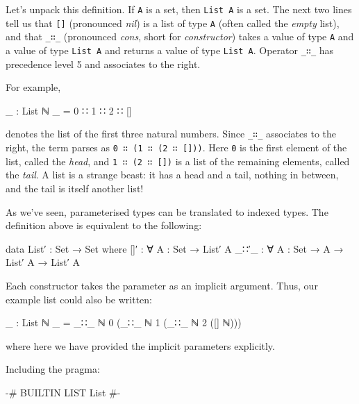 Let's unpack this definition. If \texttt{A} is a set, then
\texttt{List\ A} is a set. The next two lines tell us that
\texttt{{[}{]}} (pronounced \emph{nil}) is a list of type \texttt{A}
(often called the \emph{empty} list), and that \texttt{\_∷\_}
(pronounced \emph{cons}, short for \emph{constructor}) takes a value of
type \texttt{A} and a value of type \texttt{List\ A} and returns a value
of type \texttt{List\ A}. Operator \texttt{\_∷\_} has precedence level 5
and associates to the right.

For example,

\begin{fence}
\begin{code}
_ : List ℕ
_ = 0 ∷ 1 ∷ 2 ∷ []
\end{code}
\end{fence}

denotes the list of the first three natural numbers. Since
\texttt{\_∷\_} associates to the right, the term parses as
\texttt{0\ ∷\ (1\ ∷\ (2\ ∷\ {[}{]}))}. Here \texttt{0} is the first
element of the list, called the \emph{head}, and
\texttt{1\ ∷\ (2\ ∷\ {[}{]})} is a list of the remaining elements,
called the \emph{tail}. A list is a strange beast: it has a head and a
tail, nothing in between, and the tail is itself another list!

As we've seen, parameterised types can be translated to indexed types.
The definition above is equivalent to the following:

\begin{fence}
\begin{code}
data List′ : Set → Set where
  []′  : ∀ {A : Set} → List′ A
  _∷′_ : ∀ {A : Set} → A → List′ A → List′ A
\end{code}
\end{fence}

Each constructor takes the parameter as an implicit argument. Thus, our
example list could also be written:

\begin{fence}
\begin{code}
_ : List ℕ
_ = _∷_ {ℕ} 0 (_∷_ {ℕ} 1 (_∷_ {ℕ} 2 ([] {ℕ})))
\end{code}
\end{fence}

where here we have provided the implicit parameters explicitly.

Including the pragma:

\begin{myDisplay}
{-# BUILTIN LIST List #-}
\end{myDisplay}

